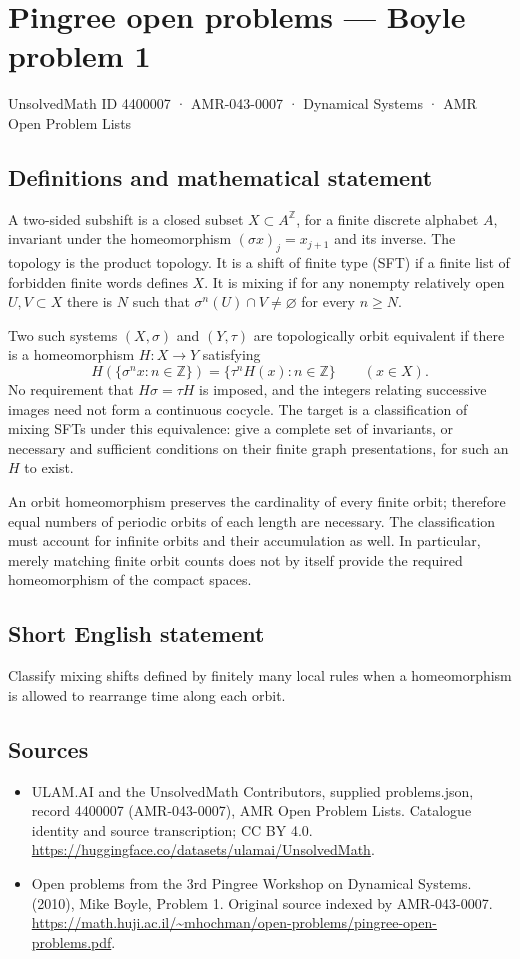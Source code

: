 \documentclass[11pt,a4paper]{article}
\begin{document}
\section*{Pingree open problems — Boyle problem 1}\label{4400007}
{\small UnsolvedMath ID 4400007 · AMR-043-0007 · Dynamical Systems · AMR Open Problem Lists}
\subsection{Definitions and mathematical statement}
A two-sided subshift is a closed subset $X\subset A^{\mathbb Z}$, for a
finite discrete alphabet $A$, invariant under the homeomorphism
$(\sigma x)_j=x_{j+1}$ and its inverse. The topology is the product topology.
It is a shift of finite type (SFT) if a finite list of forbidden finite words
defines $X$. It is mixing if for any nonempty relatively open $U,V\subset X$
there is $N$ such that $\sigma^n(U)\cap V\ne\varnothing$ for every $n\ge N$.

Two such systems $(X,\sigma)$ and $(Y,\tau)$ are topologically orbit equivalent
if there is a homeomorphism $H:X\to Y$ satisfying
\[
 H(\{\sigma^n x:n\in\mathbb Z\})
   =\{\tau^n H(x):n\in\mathbb Z\}\qquad(x\in X).
\]
No requirement that $H\sigma=\tau H$ is imposed, and the integers relating
successive images need not form a continuous cocycle. The target is a
classification of mixing SFTs under this equivalence: give a complete set of
invariants, or necessary and sufficient conditions on their finite graph
presentations, for such an $H$ to exist.

An orbit homeomorphism preserves the cardinality of every finite orbit;
therefore equal numbers of periodic orbits of each length are necessary.
The classification must account for infinite orbits and their accumulation
as well. In particular, merely matching finite orbit counts does not by
itself provide the required homeomorphism of the compact spaces.
\subsection{Short English statement}
Classify mixing shifts defined by finitely many local rules when a homeomorphism is allowed to rearrange time along each orbit.
\subsection{Sources}
\begin{itemize}
\item[S1] ULAM.AI and the UnsolvedMath Contributors, supplied problems.json, record 4400007 (AMR-043-0007), AMR Open Problem Lists. Catalogue identity and source transcription; CC BY 4.0.
\url{https://huggingface.co/datasets/ulamai/UnsolvedMath}.
\item[S2] Open problems from the 3rd Pingree Workshop on Dynamical Systems. (2010), Mike Boyle, Problem 1. Original source indexed by AMR-043-0007.
\url{https://math.huji.ac.il/~mhochman/open-problems/pingree-open-problems.pdf}.
\end{itemize}
\end{document}

